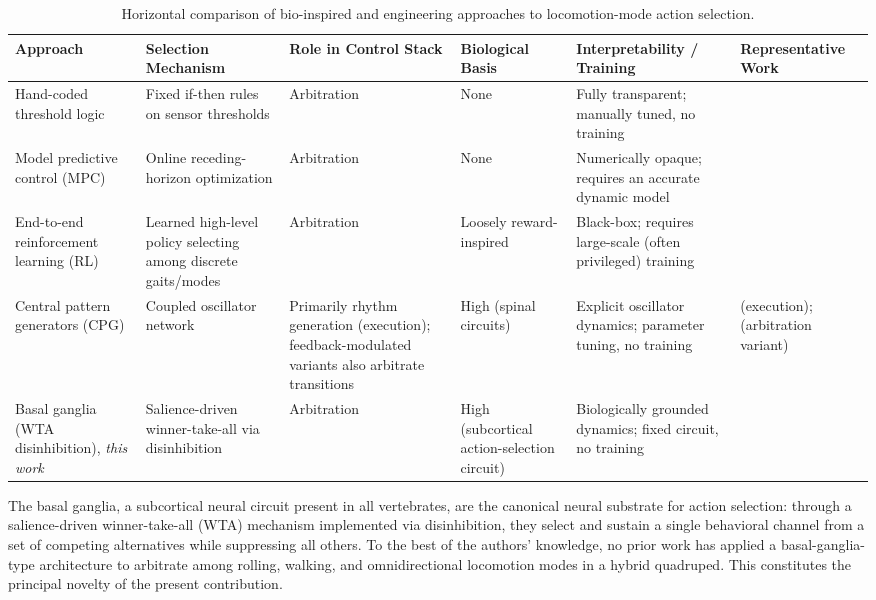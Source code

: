 \documentclass[preprint,12pt]{elsarticle}
\begin{document}
\begin{table}[t]
\centering
\caption{Horizontal comparison of bio-inspired and engineering approaches to locomotion-mode action selection.}
\footnotesize
\begin{tabular}{|p{2.1cm}|p{2.6cm}|p{1.9cm}|p{1.4cm}|p{2.4cm}|p{2.0cm}|}
\hline
\textbf{Approach} & \textbf{Selection Mechanism} & \textbf{Role in Control Stack} & \textbf{Biological Basis} & \textbf{Interpretability / Training} & \textbf{Representative Work} \\ \hline
Hand-coded threshold logic & Fixed if-then rules on sensor thresholds & Arbitration & None & Fully transparent; manually tuned, no training & \citet{Kashiri2019CENTAURO} \\ \hline
Model predictive control (MPC) & Online receding-horizon optimization & Arbitration & None & Numerically opaque; requires an accurate dynamic model & \citet{bjelonic2019,Bjelonic2022OfflineMotion} \\ \hline
End-to-end reinforcement learning (RL) & Learned high-level policy selecting among discrete gaits/modes & Arbitration & Loosely reward-inspired & Black-box; requires large-scale (often privileged) training & \citet{Yang2021GaitTransitions,Humphreys2025BioInspired} \\ \hline
Central pattern generators (CPG) & Coupled oscillator network & Primarily rhythm generation (execution); feedback-modulated variants also arbitrate transitions & High (spinal circuits) & Explicit oscillator dynamics; parameter tuning, no training & \citet{ijspeert2008,Bellegarda2022CPGRL,Manoonpong2013Neural} (execution); \citet{Fukui2019VestibularCPG,Owaki2017SpontaneousGait} (arbitration variant) \\ \hline
Basal ganglia (WTA disinhibition), \emph{this work} & Salience-driven winner-take-all via disinhibition & Arbitration & High (subcortical action-selection circuit) & Biologically grounded dynamics; fixed circuit, no training & \citet{Gurney2001a,Gurney2001b,Prescott2006Robot,Girard2003Basal,sarvestani2013computational,Baston2015Biologically,Prescott2024Simulated} \\ \hline
\end{tabular}
\label{table:action_selection_comparison}
\end{table}


The basal ganglia, a subcortical neural circuit present in all vertebrates, are the canonical neural substrate for action selection: through a salience-driven winner-take-all (WTA) mechanism implemented via disinhibition, they select and sustain a single behavioral channel from a set of competing alternatives while suppressing all others. To the best of the authors' knowledge, no prior work has applied a basal-ganglia-type architecture to arbitrate among rolling, walking, and omnidirectional locomotion modes in a hybrid quadruped. This constitutes the principal novelty of the present contribution.
\end{document}
